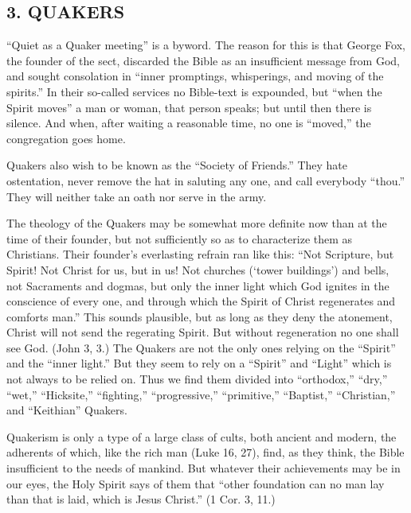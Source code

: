 \documentclass[
]{book}
\begin{document}
\hypertarget{quakers}{%
\subsection*{\texorpdfstring{3. QUAKERS}{3. QUAKERS}}\label{quakers}}

``Quiet as a Quaker meeting'' is a byword. The reason for this is that George Fox, the founder of the sect, discarded the Bible as an insufficient message from God, and sought consolation in ``inner promptings, whisperings, and moving of the spirits.'' In their so-called services no Bible-text is expounded, but ``when the Spirit moves'' a man or woman, that person speaks; but until then there is silence. And when, after waiting a reasonable time, no one is ``moved,'' the congregation goes home.

Quakers also wish to be known as the ``Society of Friends.'' They hate ostentation, never remove the hat in saluting any one, and call everybody ``thou.'' They will neither take an oath nor serve in the army.

The theology of the Quakers may be somewhat more definite now than at the time of their founder, but not sufficiently so as to characterize them as Christians. Their founder's everlasting refrain ran like this: ``Not Scripture, but Spirit! Not Christ for us, but in us! Not churches (`tower buildings') and bells, not Sacraments and dogmas, but only the inner light which God ignites in the conscience of every one, and through which the Spirit of Christ regenerates and comforts man.'' This sounds plausible, but as long as they deny the atonement, Christ will not send the regerating Spirit. But without regeneration no one shall see God. (John 3, 3.) The Quakers are not the only ones relying on the ``Spirit'' and the ``inner light.'' But they seem to rely on a ``Spirit'' and ``Light'' which is not always to be relied on. Thus we find them divided into ``orthodox,'' ``dry,'' ``wet,'' ``Hicksite,'' ``fighting,'' ``progressive,'' ``primitive,'' ``Baptist,'' ``Christian,'' and ``Keithian'' Quakers.

Quakerism is only a type of a large class of cults, both ancient and modern, the adherents of which, like the rich man (Luke 16, 27), find, as they think, the Bible insufficient to the needs of mankind. But whatever their achievements may be in our eyes, the Holy Spirit says of them that ``other foundation can no man lay than that is laid, which is Jesus Christ.'' (1 Cor. 3, 11.)
\end{document}
